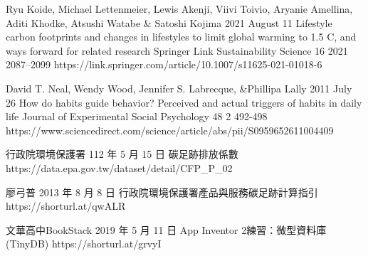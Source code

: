 

\item \eenjournal
{Ryu Koide, Michael Lettenmeier, Lewis Akenji, Viivi Toivio, Aryanie Amellina, Aditi Khodke, Atsushi Watabe \& Satoshi Kojima } %
{2021 August 11} %
{Lifestyle carbon footprints and changes in lifestyles to limit global warming to 1.5 C, and ways forward for related research} %
{Springer Link Sustainability Science} %
{16} %
{2021}%
{2087–2099} %
{ https://link.springer.com/article/10.1007/s11625-021-01018-6 }

\item \eenjournal
{David T. Neal, Wendy Wood, Jennifer S. Labrecque, \&Phillipa Lally} %
{2011 July 26} %
{How do habits guide behavior? Perceived and actual triggers of habits in daily life} %
{Journal of Experimental Social Psychology} %
{48} %
{2}%
{492-498} %
{ https://www.sciencedirect.com/science/article/abs/pii/S0959652611004409 }

\item \simpleinternet
{行政院環境保護署}
{112 年 5 月 15 日}
{碳足跡排放係數}
{ https://data.epa.gov.tw/dataset/detail/CFP_P_02 }

\item  \simpleinternet
{廖弓普}
{2013 年 8 月 8 日}
{行政院環境保護署產品與服務碳足跡計算指引}
{https://shorturl.at/qwALR}

\item \simpleinternet
{文華高中BookStack}
{2019 年 5 月 11 日}
{App Inventor 2練習：微型資料庫(TinyDB)}
{ https://shorturl.at/grvyI }

